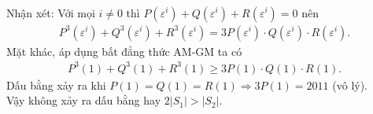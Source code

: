 \begin{bt}
{\begin{eqnarray*}
		\end{eqnarray*}
		Nhận xét: Với mọi $i\ne 0$ thì $P(\varepsilon ^i)+Q(\varepsilon ^i)+R(\varepsilon ^i)=0$ nên
		\begin{eqnarray*}
			P^3(\varepsilon ^i)+Q^3(\varepsilon ^i)+R^3(\varepsilon ^i)=3P(\varepsilon ^i)\cdot Q(\varepsilon ^i)\cdot R(\varepsilon ^i).
		\end{eqnarray*}
		Mặt khác, áp dụng bất đẳng thức AM-GM ta có 
		\begin{eqnarray*}
			P^3(1)+Q^3(1)+R^3(1)\ge 3P(1)\cdot Q(1)\cdot R(1).
		\end{eqnarray*}
		Dấu bằng xảy ra khi $P(1)=Q(1)=R(1)\Rightarrow 3P(1)=2011$ (vô lý).\\
		Vậy không xảy ra dấu bằng hay $2|S_1|>|S_2|.$
	}
\end{bt}

